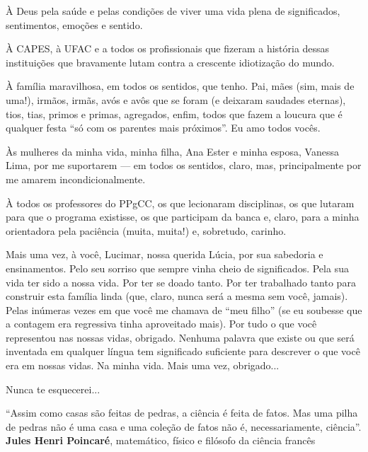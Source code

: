 \documentclass[
	12pt,				%
	openright,			%
	oneside,			%
	a4paper,			%
	english,			%
	french,				%
	spanish,			%
	brazil				%
	]{abntex2}
\begin{document}
\begin{agradecimentos}
À Deus pela saúde e pelas condições de viver uma vida plena de significados, sentimentos, emoções e sentido.

À CAPES, à UFAC e a todos os profissionais que fizeram a história dessas instituições que bravamente lutam contra a crescente idiotização do mundo.

À família maravilhosa, em todos os sentidos, que tenho. Pai, mães (sim, mais de uma!), irmãos, irmãs, avós e avôs que se foram (e deixaram saudades eternas), tios, tias, primos e primas, agregados, enfim, todos que fazem a loucura que é qualquer festa ``só com os parentes mais próximos''. Eu amo todos vocês. 

Às mulheres da minha vida, minha filha, Ana Ester e minha esposa, Vanessa Lima, por me suportarem --- em todos os sentidos, claro, mas, principalmente por me amarem incondicionalmente.

À todos os professores do PPgCC, os que lecionaram disciplinas, os que lutaram para que o programa existisse, os que participam da banca e, claro, para a minha orientadora pela paciência (muita, muita!) e, sobretudo, carinho.

Mais uma vez, à você, Lucimar, nossa querida Lúcia, por sua sabedoria e ensinamentos. Pelo seu sorriso que sempre vinha cheio de significados. Pela sua vida ter sido a nossa vida. Por ter se doado tanto. Por ter trabalhado tanto para construir esta família linda (que, claro, nunca será a mesma sem você, jamais). Pelas inúmeras vezes em que você me chamava de ``meu filho'' (se eu soubesse que a contagem era regressiva tinha aproveitado mais). Por tudo o que você representou nas nossas vidas, obrigado. Nenhuma palavra que existe ou que será inventada em qualquer língua tem significado suficiente para descrever o que você era em nossas vidas. Na minha vida. Mais uma vez, obrigado... 

Nunca te esquecerei...
\end{agradecimentos}
\clearpage
\begin{epigrafe}
    \vspace*{\fill}
	\begin{flushright}
		``Assim como casas são feitas de pedras, a ciência é feita de fatos. Mas uma pilha de pedras não é uma casa e uma coleção de fatos não é, necessariamente, ciência''.  \\ \textbf{Jules Henri Poincaré}, matemático, físico e filósofo da ciência francês
	\end{flushright}
\end{epigrafe}
\end{document}
